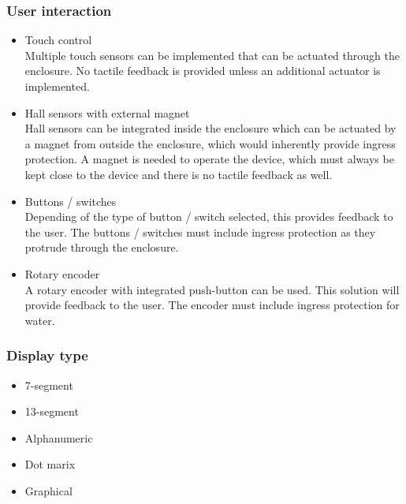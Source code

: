 \subsubsection{User interaction}
\begin{itemize}
     \item Touch control
        \\
        Multiple touch sensors can be implemented that can be actuated through the enclosure. No tactile feedback is provided unless an additional actuator is implemented. 
    \item Hall sensors with external magnet
        \\
        Hall sensors can be integrated inside the enclosure which can be actuated by a magnet from outside the enclosure, which would inherently provide ingress protection. A magnet is needed to operate the device, which must always be kept close to the device and there is no tactile feedback as well. 
    \item Buttons / switches
        \\
        Depending of the type of button / switch selected, this provides feedback to the user. The buttons / switches must include ingress protection as they protrude through the enclosure. 
    \item Rotary encoder
        \\
        A rotary encoder with integrated push-button can be used. This solution will provide feedback to the user. The encoder must include ingress protection for water. 
\end{itemize}

\subsubsection{Display type}
\begin{itemize}
     \item 7-segment
        \\
    \item 13-segment
        \\
    \item Alphanumeric
        \\
    \item Dot marix
        \\
    \item Graphical
        \\
\end{itemize}

